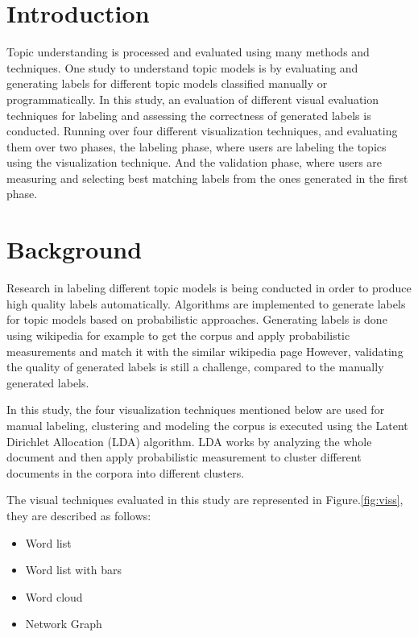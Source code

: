 \section{Introduction}
\label{sec:intro}

Topic understanding is processed and evaluated using many methods and techniques. One study to understand topic models is by evaluating and
generating labels for different topic models classified manually or programmatically. In this study, an evaluation of different visual evaluation techniques
for labeling and assessing the correctness of generated labels is conducted. Running over four different visualization techniques, and evaluating them
over two phases, the labeling phase, where users are labeling the topics using the visualization technique. And the validation phase, where users are
measuring and selecting best matching labels from the ones generated in the first phase.

\section{Background}
\label{sec:bg}

Research in labeling different topic models is being conducted in order to produce high quality labels automatically. Algorithms are implemented
to generate labels for topic models based on probabilistic approaches. Generating labels
is done using wikipedia for example to get the corpus and apply probabilistic measurements and match it with the similar wikipedia page \cite{lau}
However, validating the quality of generated labels is still a challenge, compared to the manually generated labels.

\newParagraph
In this study, the four visualization techniques mentioned below are used for manual labeling, clustering and modeling the corpus is executed using the
Latent Dirichlet Allocation (LDA) algorithm. LDA works by analyzing the whole document and then apply probabilistic measurement to cluster different documents
in the corpora into different clusters.

\newParagraph
The visual techniques evaluated in this study are represented in Figure.\ref{fig:viss}, they are described as follows:
\begin{itemize}
  \item Word list
  \item Word list with bars
  \item Word cloud
  \item Network Graph
\end{itemize}

